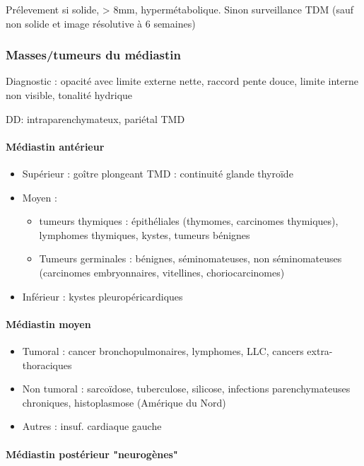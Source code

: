 \documentclass[11pt]{article}
\begin{document}
Prélevement si solide, > 8mm, hypermétabolique. Sinon surveillance TDM (sauf non solide et image résolutive à 6 semaines)

\subsubsection{Masses/tumeurs du médiastin}
\label{sec:orge725384}
Diagnostic : opacité avec limite externe nette, raccord pente douce, limite interne non
visible, tonalité hydrique

DD: intraparenchymateux, pariétal \thus TMD

\paragraph{Médiastin antérieur}
\label{sec:org7c8d178}

\begin{itemize}
\item Supérieur : goître plongeant \thus TMD : continuité glande thyroïde
\item Moyen : 

\begin{itemize}
\item tumeurs thymiques : épithéliales (thymomes, carcinomes thymiques),
lymphomes thymiques, kystes, tumeurs bénignes
\item Tumeurs germinales : bénignes, séminomateuses, non séminomateuses
(carcinomes embryonnaires, vitellines, choriocarcinomes)
\end{itemize}

\item Inférieur : kystes pleuropéricardiques
\end{itemize}


\paragraph{Médiastin moyen}
\label{sec:org97861a2}

\begin{itemize}
\item Tumoral : cancer bronchopulmonaires, lymphomes, LLC, cancers
extra-thoraciques
\item Non tumoral : sarcoïdose, tuberculose, silicose, infections
parenchymateuses chroniques, histoplasmose (Amérique du Nord)
\item Autres : insuf. cardiaque gauche
\end{itemize}


\paragraph{Médiastin postérieur "neurogènes"}
\label{sec:org67815b9}
\end{document}
